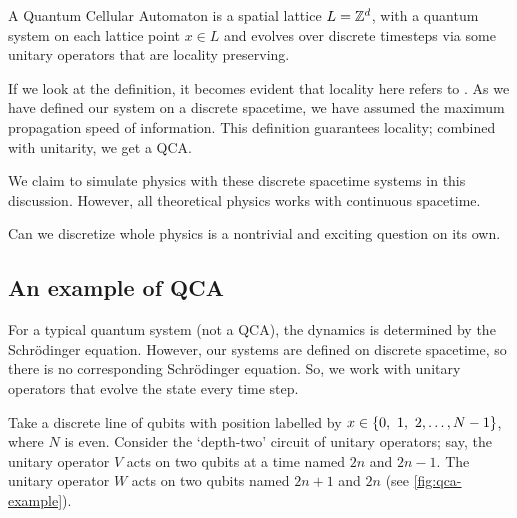\documentclass[11pt, oneside, listof=totoc]{scrbook}
\begin{document}
\begin{definition}
    A Quantum Cellular Automaton is a spatial lattice \(L = \mathbb Z^d\), with a quantum system on each lattice point \(x \in L\) and evolves over discrete timesteps via some unitary operators that are locality preserving.
\end{definition}

If we look at the definition, it becomes evident that locality here refers to . As we have defined our system on a discrete spacetime, we have assumed the maximum propagation speed of information. This definition guarantees locality; combined with unitarity, we get a QCA.

\begin{moral}
    We claim to simulate physics with these discrete spacetime systems in this discussion. However, all theoretical physics works with continuous spacetime.

    \noindent Can we discretize whole physics is a nontrivial and exciting question on its own.
\end{moral}

\subsection[An example of QCA]{An example of QCA \cite{Farrelly2019}}\label{ssec:initial-rqc}

For a typical quantum system (not a QCA), the dynamics is determined by the Schr\"odinger equation. However, our systems are defined on discrete spacetime, so there is no corresponding Schr\"odinger equation. So, we work with unitary operators that evolve the state every time step.

Take a discrete line of qubits with position labelled by \(x \in \qty{0,~1,~2,\dots,N-1}\), where \(N\) is even. Consider the `depth-two' circuit of unitary operators; say, the unitary operator \(V\) acts on two qubits at a time named \(2 n\) and \(2 n - 1\). The unitary operator \(W\) acts on two qubits named \(2n+1\) and \(2n\) (see \cref{fig:qca-example}).
\end{document}
